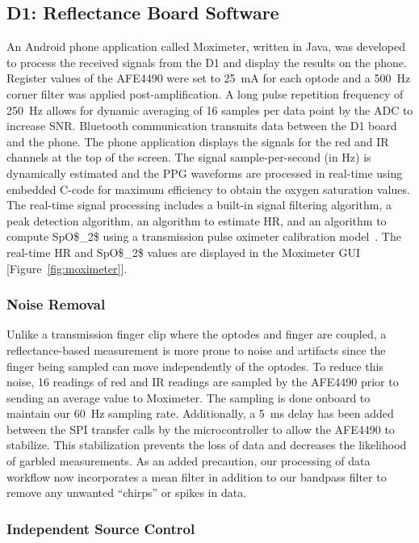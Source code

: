 \subsection{D1: Reflectance Board Software}
An Android phone application called Moximeter, written in Java, was developed to process the received signals from the D1 and display the results on the phone. Register values of the \ac{AFE4490} were set to 25~mA for each optode and a 500~Hz corner filter was applied post-amplification. A long pulse repetition frequency of 250~Hz allows for dynamic averaging of 16 samples per data point by the \ac{ADC} to increase \ac{SNR}. Bluetooth communication transmits data between the D1 board and the phone. The phone application displays the signals for the red and \ac{IR} channels at the top of the screen. The signal sample-per-second (in Hz) is dynamically estimated and the \ac{PPG} waveforms are processed in real-time using embedded C-code for maximum efficiency to obtain the oxygen saturation values. The real-time signal processing includes a built-in signal filtering algorithm, a peak detection algorithm, an algorithm to estimate \ac{HR}, and an algorithm to compute \ac{SpO$_2$} using a transmission pulse oximeter calibration model~\cite{Bailey2008}. The real-time \ac{HR} and \ac{SpO$_2$} values are displayed in the Moximeter \ac{GUI} [Figure~\ref{fig:moximeter}]. 
    
\subsubsection{Noise Removal}
Unlike a transmission finger clip where the optodes and finger are coupled, a reflectance-based measurement is more prone to noise and artifacts since the finger being sampled can move independently of the optodes. To reduce this noise, 16 readings of red and \ac{IR} readings are sampled by the \ac{AFE4490} prior to sending an average value to Moximeter. The sampling is done onboard to maintain our 60~Hz sampling rate. Additionally, a 5~ms delay has been added between the \ac{SPI} transfer calls by the microcontroller to allow the \ac{AFE4490} to stabilize. This stabilization prevents the loss of data and decreases the likelihood of garbled measurements. As an added precaution, our processing of data workflow now incorporates a mean filter in addition to our bandpass filter to remove any unwanted ``chirps'' or spikes in data. 
        
\subsubsection{Independent Source Control}

